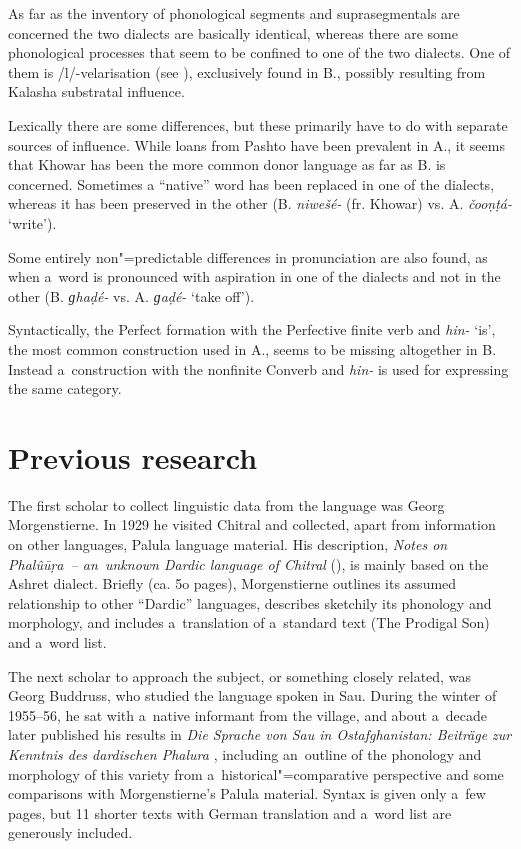 As far as the inventory of phonological segments and suprasegmentals are concerned the two dialects
are basically identical, whereas there are some phonological processes that seem to be confined to
one of the two dialects. One of them is /l/-velarisation (see ), exclusively
found in B., possibly resulting from Kalasha substratal influence.


Lexically there are some differences, but these primarily have to do with separate sources of influence. While loans from Pashto have been prevalent in A., it seems that Khowar has been the more common donor language as far as B. is concerned. Sometimes a ``native'' word has been replaced in one of the dialects, whereas it has been preserved in the other (B. \textit{niwešé-} (fr. Khowar) vs. A. \textit{čooṇṭá-} `write'). 


Some entirely non"=predictable differences in pronunciation are also found, as when a~word is pronounced with aspiration in one of the dialects and not in the other (B. \textit{ɡhaḍé-} vs. A. \textit{ɡaḍé-} `take off').


Syntactically, the Perfect formation with the Perfective finite verb and \textit{hin-} `is', the most common construction used in A., seems to be missing altogether in B. Instead a~construction with the nonfinite Converb and \textit{hin-} is used for expressing the same category.


\section{Previous research}
\label{sec:1-5}

The first scholar to collect linguistic data from the language was Georg Morgenstierne. In 1929 he visited Chitral and
collected, apart from information on other languages, Palula language material. His description,
\textit{Notes on Phalû\=uṛa~-- an~unknown Dardic language of Chitral}
(\citeyear{morgenstierne1941}), is mainly based on the Ashret dialect. Briefly (ca. 5o pages),
Morgenstierne outlines its assumed relationship to other ``Dardic'' languages, describes sketchily its
phonology and morphology, and includes a~translation of a~standard text (The Prodigal Son) and
a~word list.


The next scholar to approach the subject, or something closely related, was Georg
Buddruss, who studied the language spoken in Sau. During the winter of 1955--56, he sat with a~native
informant from the village, and about a~decade later published his results in \textit{Die Sprache
  von Sau in Ostafghanistan: Beiträge zur Kenntnis des dardischen Phalura} \citep{buddruss1967},
including an~outline of the phonology and morphology of this variety from a~historical"=comparative
perspective and some comparisons with Morgenstierne's Palula material. Syntax is given only a~few
pages, but 11 shorter texts with German translation and a~word list are generously included.


